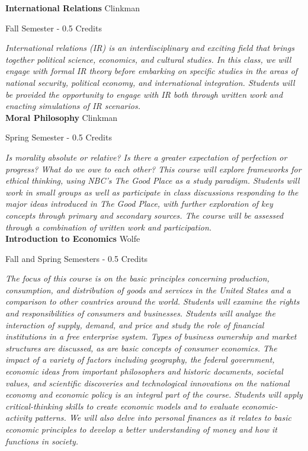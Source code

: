 \noindent\textbf{International Relations} \hfill Clinkman

\noindent Fall Semester - 0.5 Credits

\vspace{1mm}\emph{International relations (IR) is an interdisciplinary and exciting field that brings together political science, economics, and cultural studies. In this class, we will engage with formal IR theory before embarking on specific studies in the areas of national security, political economy, and international integration. Students will be provided the opportunity to engage with IR both through written work and enacting simulations of IR scenarios.}\\


\noindent\textbf{Moral Philosophy} \hfill Clinkman

\noindent Spring Semester - 0.5 Credits

\vspace{1mm}\emph{Is morality absolute or relative? Is there a greater expectation of perfection or progress? What do we owe to each other? This course will explore frameworks for ethical thinking, using NBC’s The Good Place as a study paradigm. Students will work in small groups as well as participate in class discussions responding to the major ideas introduced in The Good Place, with further exploration of key concepts through primary and secondary sources. The course will be assessed through a combination of written work and participation.}\\


\noindent\textbf{Introduction to Economics} \hfill Wolfe

\noindent Fall and Spring Semesters - 0.5 Credits

\vspace{1mm}\emph{The focus of this course is on the basic principles concerning production, consumption, and distribution of goods and services in the United States and a comparison to other countries around the world. Students will examine the rights and responsibilities of consumers and businesses. Students will analyze the interaction of supply, demand, and price and study the role of financial institutions in a free enterprise system. Types of business ownership and market structures are discussed, as are basic concepts of consumer economics. The impact of a variety of factors including geography, the federal government, economic ideas from important philosophers and historic documents, societal values, and scientific discoveries and technological innovations on the national economy and economic policy is an integral part of the course. Students will apply critical-thinking skills to create economic models and to evaluate economic-activity patterns. We will also delve into personal finances as it relates to basic economic principles to develop a better understanding of money and how it functions in society.}\\


